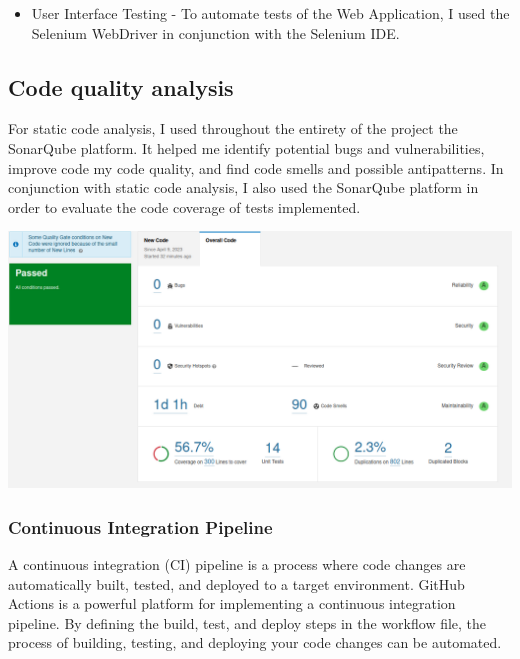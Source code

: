 \documentclass[12pt]{article}
\begin{document}
\begin{itemize}
\item User Interface Testing - To automate tests of the Web Application, I used the Selenium WebDriver in conjunction with the Selenium IDE. 
\end{itemize}
\clearpage
\subsection{Code quality analysis}

For static code analysis, I used throughout the entirety of the project the SonarQube platform. It helped me identify potential bugs and vulnerabilities, improve code my code quality, and find code smells and possible antipatterns. In conjunction with static code analysis, I also used the SonarQube platform in order to evaluate the code coverage of tests implemented.

\includegraphics[scale=0.35]{sonarQube.png}
\clearpage
\subsubsection{Continuous Integration Pipeline}

A continuous integration (CI) pipeline is a process where code changes are automatically built, tested, and deployed to a target environment. GitHub Actions is a powerful platform for implementing a continuous integration pipeline. By defining the build, test, and deploy steps in the workflow file, the process of building, testing, and deploying your code changes can be automated.
\end{document}
